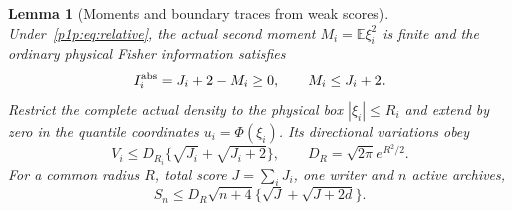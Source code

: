 \documentclass[11pt]{article}
\numberwithin{equation}{section}
\newtheorem{lemma}[theorem]{Lemma}
\theoremstyle{definition}
\theoremstyle{remark}
\begin{document}
\begin{lemma}[Moments and boundary traces from weak scores]
\label{p1p:lem:physicalBV}
Under~\eqref{p1p:eq:relative}, the actual second moment $M_i=\mathbb E\xi_i^2$
is finite and the ordinary physical Fisher information satisfies
\begin{equation}\label{p1p:eq:momentidentity}
 I_i^{\rm abs}=J_i+2-M_i\geq0,
 \qquad M_i\leq J_i+2.
\end{equation}
Restrict the complete actual density to the physical box
$|\xi_i|\leq R_i$ and extend by zero in the quantile coordinates
$u_i=\Phi(\xi_i)$. Its directional variations obey
\begin{equation}\label{p1p:eq:physicalBV}
 V_i\leq D_{R_i}\{\sqrt{J_i}+\sqrt{J_i+2}\},
 \qquad D_R=\sqrt{2\pi}e^{R^2/2}.
\end{equation}
For a common radius $R$, total score $J=\sum_iJ_i$, one writer and $n$
active archives,
\begin{equation}\label{p1p:eq:physicalS}
 S_n\leq D_R\sqrt{n+4}\{\sqrt J+\sqrt{J+2d}\}.
\end{equation}
\end{lemma}
\end{document}
